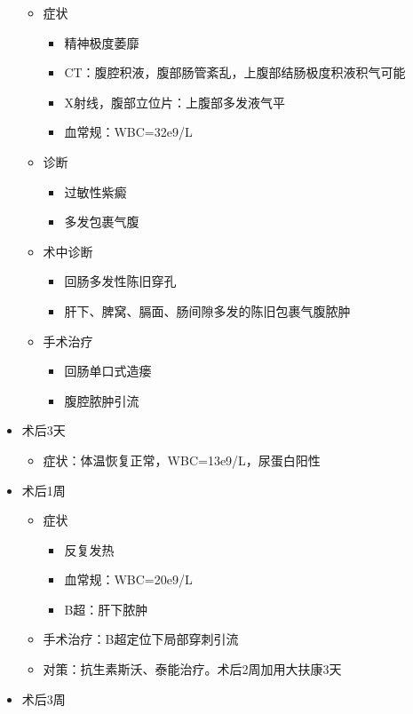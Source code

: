 \documentclass[]{article}
\providecommand{\tightlist}{%
  \setlength{\itemsep}{0pt}\setlength{\parskip}{0pt}}
\begin{document}
\begin{multicols}{3}
\begin{itemize}
  \begin{itemize}
  \tightlist
  \item
    症状

    \begin{itemize}
    \tightlist
    \item
      精神极度萎靡
    \item
      CT：腹腔积液，腹部肠管紊乱，上腹部结肠极度积液积气可能
    \item
      X射线，腹部立位片：上腹部多发液气平
    \item
      血常规：WBC=32e9/L
    \end{itemize}
  \item
    诊断

    \begin{itemize}
    \tightlist
    \item
      过敏性紫癜
    \item
      多发包裹气腹
    \end{itemize}
  \item
    术中诊断

    \begin{itemize}
    \tightlist
    \item
      回肠多发性陈旧穿孔
    \item
      肝下、脾窝、膈面、肠间隙多发的陈旧包裹气腹脓肿
    \end{itemize}
  \item
    手术治疗

    \begin{itemize}
    \tightlist
    \item
      回肠单口式造瘘
    \item
      腹腔脓肿引流
    \end{itemize}
  \end{itemize}
\item
  术后3天

  \begin{itemize}
  \tightlist
  \item
    症状：体温恢复正常，WBC=13e9/L，尿蛋白阳性
  \end{itemize}
\item
  术后1周

  \begin{itemize}
  \tightlist
  \item
    症状

    \begin{itemize}
    \tightlist
    \item
      反复发热
    \item
      血常规：WBC=20e9/L
    \item
      B超：肝下脓肿
    \end{itemize}
  \item
    手术治疗：B超定位下局部穿刺引流
  \item
    对策：抗生素斯沃、泰能治疗。术后2周加用大扶康3天
  \end{itemize}
\item
  术后3周


\end{itemize}
\end{multicols}
\end{document}
